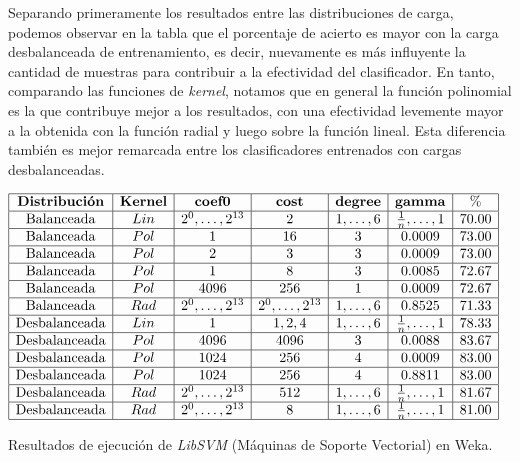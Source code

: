 Separando primeramente los resultados entre las distribuciones de carga, podemos observar en la tabla que el porcentaje de acierto es mayor con la carga desbalanceada de entrenamiento, es decir, nuevamente es m\'as influyente la cantidad de muestras para contribuir a la efectividad del clasificador. En tanto, comparando las funciones de \textit{kernel}, notamos que en general la funci\'on polinomial es la que contribuye mejor a los resultados, con una efectividad levemente mayor a la obtenida con la funci\'on radial y luego sobre la funci\'on lineal. Esta diferencia tambi\'en es mejor remarcada entre los clasificadores entrenados con cargas desbalanceadas.

\begin{table}[htb] 
\centering

$
\begin{array}{|c|c|c|c|c|c|c|}
      \hline
      \mathbf{Distribuci\acute{o}n} & \mathbf{Kernel} & \mathbf{coef0} & \mathbf{cost} & \mathbf{degree} & \mathbf{gamma} & \mathbf{\%} \\
      \hline
      \mathrm{Balanceada} & Lin & 2^0,\ldots,2^{13} & 2 & 1,\ldots,6 & {1 \over n},\ldots,1 & 70.00	\\
      \hline
      \mathrm{Balanceada} & Pol & 1 &	16 & 3 & 0.0009 & 73.00	\\
      \hline
      \mathrm{Balanceada} & Pol &	2 &	3 & 3 & 0.0009 & 73.00 \\
      \hline
      \mathrm{Balanceada} & Pol & 1 & 8 & 3 & 0.0085 & 72.67	\\
      \hline
      \mathrm{Balanceada} & Pol & 4096 & 256 & 1 & 0.0009 & 72.67	\\
      \hline
      \mathrm{Balanceada} & Rad & 2^0,\ldots,2^{13} & 2^0,\ldots,2^{13} & 1,\ldots,6 & 0.8525 & 71.33	\\
      \hline
      \mathrm{Desbalanceada}	& Lin & 1 &	1,2,4 &	1,\ldots,6 & {1 \over n},\ldots,1 & 78.33 \\
      \hline
      \mathrm{Desbalanceada}	& Pol &	4096 & 4096	& 3 & 0.0088 & 83.67 \\
      \hline
      \mathrm{Desbalanceada}	& Pol & 1024 & 256 & 4 & 0.0009 & 83.00	\\
      \hline
      \mathrm{Desbalanceada}	& Pol &	1024 & 256 & 4 & 0.8811 & 83.00	\\
      \hline
      \mathrm{Desbalanceada}	& Rad & 2^0,\ldots,2^{13} &	512	& 1,\ldots,6 & {1 \over n},\ldots,1 & 81.67	\\
      \hline
      \mathrm{Desbalanceada}	& Rad & 2^0,\ldots,2^{13} &	8 &	1,\ldots,6 & {1 \over n},\ldots,1 & 81.00 \\
      \hline
\end{array}
$
\caption{Resultados de ejecuci\'on de \textit{LibSVM} (M\'aquinas de Soporte Vectorial) en Weka.}
\label{res:libsvm}
\end{table}

